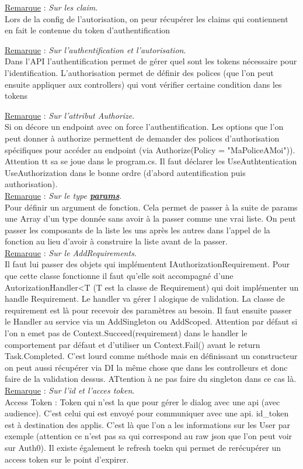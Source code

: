 \documentclass[a4paper,12pt,twoside]{article}
\newcommand{\urlcolor}{magenta}  %
\newcommand{\keycolor}{purple} %
\newcommand{\rem}[2]{\noindent\underline{Remarque} : \textit{#1}.\\ \indent #2}
\newcommand{\keyref}[2]{\hypersetup{urlcolor=\keycolor} \href{#1}{\textbf{#2}}\hypersetup{urlcolor=\urlcolor}}
\begin{document}
\rem{Sur les claim}{Lors de la config de l'autorisation, on peur récupérer les claims qui contiennent en fait le contenue du token d'authentification}

\rem{Sur l'authentification et l'autorisation}{Dans l'API l'authentification permet de gérer quel sont les tokens nécessaire pour l'identification. L'authorisation permet de définir des polices (que l'on peut ensuite appliquer aux controllers) qui vont vérifier certaine condition dans les tokens}

\rem{Sur l'attribut Authorize}{Si on décore un endpoint avec on force l'authentification. Les options que l'on peut donner à authorize permettent de demander des polices d'authorisation spécifiques pour accéder au endpoint (via Authorize(Policy = "MaPoliceAMoi")). Attention tt sa se joue dans le program.cs. Il faut déclarer les UseAuthtentication UseAuthorization dans le bonne ordre (d'abord autentification puis authorisation).}\\

\rem{Sur le type \keyref{https://docs.microsoft.com/en-us/dotnet/csharp/language-reference/keywords/params}{params}}{Pour définir un argument de fonction. Cela permet de passer à la suite de params une Array d'un type donnée sans avoir à la passer comme une vrai liste. On peut passer les composants de la liste les uns après les autres dans l'appel de la fonction au lieu d'avoir à construire la liste avant de la passer.}\\

\rem{Sur le AddRequirements}{Il faut lui passer des objets qui implémentent IAuthorizationRequirement. Pour que cette classe fonctionne il faut qu'elle soit accompagné d'une AutorizationHandler<T (T est la classe de Requirement) qui doit implémenter un handle Requirement. Le handler va gérer l alogique de validation. La classe de requirement est là pour recevoir des paramètres au besoin.  Il faut ensuite passer le Handler au service via un AddSingleton ou AddScoped. Attention par défaut si l'on n emet pas de Context.Succeed(requirement) dans le handler le comportement par défaut et d'utiliser un Context.Fail() avant le return Task.Completed. C'est lourd comme méthode mais en définissant un constructeur on peut aussi récupérer via DI la même chose que dans les controlleurs et donc faire de la validation dessus. ATtention à ne pas faire du singleton dans ce cas là.}\\

\rem{Sur l'id et l'acces token}{Access Token : Token qui n'est la que pour gérer le dialog avec une api (avec audience). C'est celui qui est envoyé pour communiquer avec une api. id\_token est à destination des applis. C'est là que l'on a les informations sur les User par exemple (attention ce n'est pas sa qui correspond au raw json que l'on peut voir sur Auth0). Il existe également le refresh toekn qui permet de rerécupérer un access token sur le point d'expirer.}\\

\end{document}
